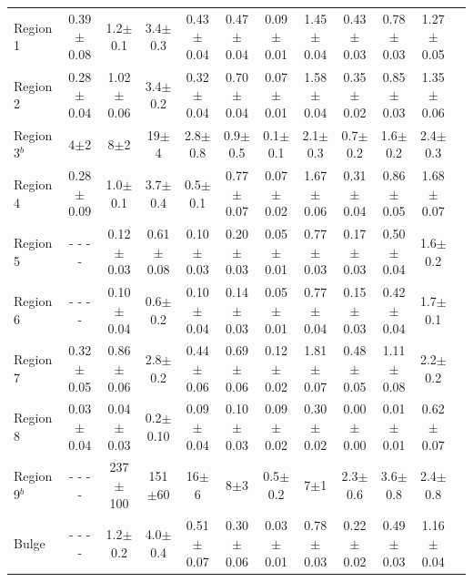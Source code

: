 \begin{table}
\begin{minipage}{200mm}
\begin{tabular}{l c c  c  c  c  c  c  c  c  c c }
 Region 1 &0.39$\pm$0.08        & 1.2$\pm$0.1             & 3.4$\pm$0.3        & 0.43$\pm$0.04        & 0.47$\pm$0.04        & 0.09$\pm$0.01        & 1.45$\pm$0.04        & 0.43$\pm$0.03        & 0.78$\pm$0.03              & 1.27$\pm$0.05        \\
 Region 2 &0.28$\pm$0.04        & 1.02$\pm$0.06        & 3.4$\pm$0.2        & 0.32$\pm$0.04        & 0.70$\pm$0.04        & 0.07$\pm$0.01        & 1.58$\pm$0.04        & 0.35$\pm$0.02        & 0.85$\pm$0.03              & 1.35$\pm$0.06        \\
 Region 3$^b$ &4$\pm$2           & 8$\pm$2                   & 19$\pm$4            & 2.8$\pm$0.8             & 0.9$\pm$0.5             & 0.1$\pm$0.1            & 2.1$\pm$0.3             & 0.7$\pm$0.2            & 1.6$\pm$0.2                   & 2.4$\pm$0.3        \\
 Region 4 &0.28$\pm$0.09        & 1.0$\pm$0.1             & 3.7$\pm$0.4       & 0.5$\pm$0.1              & 0.77$\pm$0.07        & 0.07$\pm$0.02        & 1.67$\pm$0.06        & 0.31$\pm$0.04        & 0.86$\pm$0.05             & 1.68$\pm$0.07        \\
 Region 5 & - - - -        & 0.12$\pm$0.03        & 0.61$\pm$0.08   & 0.10$\pm$0.03        & 0.20$\pm$0.03        & 0.05$\pm$0.01        & 0.77$\pm$0.03        & 0.17$\pm$0.03        & 0.50$\pm$0.04            & 1.6$\pm$0.2        \\
 Region 6 & - - - -                          & 0.10$\pm$0.04        & 0.6$\pm$0.2        & 0.10$\pm$0.04        & 0.14$\pm$0.03        & 0.05$\pm$0.01        & 0.77$\pm$0.04        & 0.15$\pm$0.03        & 0.42$\pm$0.04            & 1.7$\pm$0.1        \\
 Region 7 &0.32$\pm$0.05        & 0.86$\pm$0.06        & 2.8$\pm$0.2        & 0.44$\pm$0.06        & 0.69$\pm$0.06        & 0.12$\pm$0.02        & 1.81$\pm$0.07        & 0.48$\pm$0.05        & 1.11$\pm$0.08            & 2.2$\pm$0.2        \\
 Region 8 &0.03$\pm$0.04        & 0.04$\pm$0.03        & 0.2$\pm$0.10      & 0.09$\pm$0.04        & 0.10$\pm$0.03        & 0.09$\pm$0.02        & 0.30$\pm$0.02        & 0.00$\pm$0.00        & 0.01$\pm$0.01            & 0.62$\pm$0.07        \\
 Region 9$^b$ & - - - -                 & 237$\pm$100          & 151$\pm$60        & 16$\pm$6                 & 8$\pm$3                   & 0.5$\pm$0.2             & 7$\pm$1                   & 2.3$\pm$0.6             & 3.6$\pm$0.8                 & 2.4$\pm$0.8  \\
 Bulge       & - - - -                          & 1.2$\pm$0.2            & 4.0$\pm$0.4        & 0.51$\pm$0.07         & 0.30$\pm$0.06        & 0.03$\pm$0.01        & 0.78$\pm$0.03        & 0.22$\pm$0.02        & 0.49$\pm$0.03            & 1.16$\pm$0.04 \\       



\end{tabular}
\end{minipage}
\end{table}
